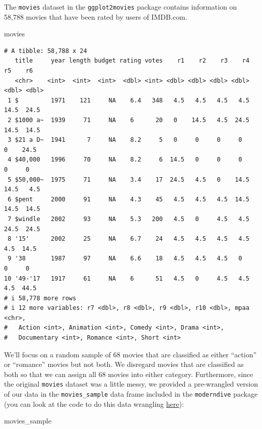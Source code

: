 \documentclass[
  letterpaper,
  DIV=11,
  numbers=noendperiod]{scrreprt}
\newenvironment{Shaded}{\begin{snugshade}}{\end{snugshade}}
\newcommand{\NormalTok}[1]{\textcolor[rgb]{0.00,0.23,0.31}{#1}}
\theoremstyle{definition}
\theoremstyle{remark}
\begin{document}
The \texttt{movies} dataset in the \texttt{ggplot2movies} package
contains information on 58,788 movies that have been rated by users of
IMDB.com.

\begin{Shaded}
\begin{Highlighting}[]
\NormalTok{movies}
\end{Highlighting}
\end{Shaded}

\begin{verbatim}
# A tibble: 58,788 x 24
   title     year length budget rating votes    r1    r2    r3    r4    r5    r6
   <chr>    <int>  <int>  <int>  <dbl> <int> <dbl> <dbl> <dbl> <dbl> <dbl> <dbl>
 1 $         1971    121     NA    6.4   348   4.5   4.5   4.5   4.5  14.5  24.5
 2 $1000 a~  1939     71     NA    6      20   0    14.5   4.5  24.5  14.5  14.5
 3 $21 a D~  1941      7     NA    8.2     5   0     0     0     0     0    24.5
 4 $40,000   1996     70     NA    8.2     6  14.5   0     0     0     0     0  
 5 $50,000~  1975     71     NA    3.4    17  24.5   4.5   0    14.5  14.5   4.5
 6 $pent     2000     91     NA    4.3    45   4.5   4.5   4.5  14.5  14.5  14.5
 7 $windle   2002     93     NA    5.3   200   4.5   0     4.5   4.5  24.5  24.5
 8 '15'      2002     25     NA    6.7    24   4.5   4.5   4.5   4.5   4.5  14.5
 9 '38       1987     97     NA    6.6    18   4.5   4.5   4.5   0     0     0  
10 '49-'17   1917     61     NA    6      51   4.5   0     4.5   4.5   4.5  44.5
# i 58,778 more rows
# i 12 more variables: r7 <dbl>, r8 <dbl>, r9 <dbl>, r10 <dbl>, mpaa <chr>,
#   Action <int>, Animation <int>, Comedy <int>, Drama <int>,
#   Documentary <int>, Romance <int>, Short <int>
\end{verbatim}

We'll focus on a random sample of 68 movies that are classified as
either ``action'' or ``romance'' movies but not both. We disregard
movies that are classified as both so that we can assign all 68 movies
into either category. Furthermore, since the original \texttt{movies}
dataset was a little messy, we provided a pre-wrangled version of our
data in the \texttt{movies\_sample} data frame included in the
\texttt{moderndive} package (you can look at the code to do this data
wrangling
\href{https://github.com/moderndive/moderndive/blob/master/data-raw/process_data_sets.R\#L14}{here}):

\begin{Shaded}
\begin{Highlighting}[]
\NormalTok{movies\_sample}
\end{Highlighting}
\end{Shaded}
\end{document}
